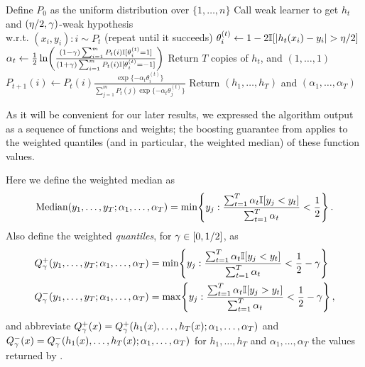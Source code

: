 \documentclass[12pt,a4paper,oneside,onecolumn]{book}
\def\hspace#1{}%
\begin{document}
\begin{algorithm}[ht]
\label{alg:medboost}
\caption{($\{(x_i,y_i)\}_{i\in[m]}$,$T$,$\adv$,$\dev$)}
\begin{algorithmic}[1]
\State Define $P_{0}$ as the uniform distribution over $\{1,\ldots,n\}$
    \State Call weak learner to get $h_{t}$ and $(\eta/2,\gamma)$-weak hypothesis \\ 
    \hspace{0.625cm} w.r.t. $(x_{i},y_{i})\! :\! i \!\sim\! P_{t}$ (repeat until it succeeds)
        \State $\theta_{i}^{(t)} \gets 1 - 2 \mathbb{I}[ |h_{t}(x_{i}) - y_{i}| > \eta/2 ]$
    \EndFor
    \State $\alpha_{t} \gets \frac{1}{2} \ln\!\left( \frac{ (1-\gamma) \sum_{i=1}^{m} P_{t}(i) \mathbb{I}[ \theta_{i}^{(t)} = 1 ] }{ (1+\gamma) \sum_{i=1}^{m} P_{t}(i) \mathbb{I}[ \theta_{i}^{(t)} = -1 ] } \right)$
        \State Return $T$ copies of $h_{t}$, and $(1,\ldots,1)$
    \EndIf
        \State $P_{t+1}(i) \gets P_{t}(i) \frac{\exp\{-\alpha_{t}\theta_{i}^{(t)}\}}{\sum_{j=1}^{m} P_{t}(j) \exp\{-\alpha_{t}\theta_{j}^{(t)}\}}$
    \EndFor
\EndFor
\State Return $(h_{1},\ldots,h_{T})$ and $(\alpha_{1},\ldots,\alpha_{T})$
\end{algorithmic}
\end{algorithm}

As it will be convenient for our later results, we expressed
the algorithm output as a sequence
of functions and weights; 
the boosting guarantee from \citet{kegl2003robust} applies to the weighted quantiles (and in particular, the weighted median) of these function values.

\begin{sloppypar}
Here we define the weighted median as 
\begin{equation*}
\text{Median}(y_{1},\ldots,y_{T};\alpha_{1},\ldots,\alpha_{T}) = \min\!\left\{ y_{j} : \frac{\sum_{t=1}^{T} \alpha_{t} \mathbb{I}[ y_{j} < y_{t} ] }{\sum_{t=1}^{T} \alpha_{t}} < \frac{1}{2} \right\}.
\end{equation*}
Also define the weighted \emph{quantiles}, for $\gamma \in [0,1/2]$, as 
\begin{align*}
Q_{\gamma}^{+}(y_{1},\ldots,y_{T};\alpha_{1},\ldots,\alpha_{T}) & = \min\!\left\{ y_{j} : \frac{\sum_{t=1}^{T} \alpha_{t} \mathbb{I}[ y_{j} < y_{t} ] }{\sum_{t=1}^{T} \alpha_{t}} < \frac{1}{2} - \gamma \right\}
\\ Q_{\gamma}^{-}(y_{1},\ldots,y_{T};\alpha_{1},\ldots,\alpha_{T}) & = \max\!\left\{ y_{j} : \frac{\sum_{t=1}^{T} \alpha_{t} \mathbb{I}[ y_{j} > y_{t} ] }{\sum_{t=1}^{T} \alpha_{t}} < \frac{1}{2} - \gamma \right\},
\end{align*}
and abbreviate $Q_{\gamma}^{+}(x) = Q_{\gamma}^{+}(h_{1}(x),\ldots,h_{T}(x);\alpha_{1},\ldots,\alpha_{T})$ and $Q_{\gamma}^{-}(x) = Q_{\gamma}^{-}(h_{1}(x),\ldots,h_{T}(x);\alpha_{1},\ldots,\alpha_{T})$ 
for $h_{1},\ldots,h_{T}$ and $\alpha_{1},\ldots,\alpha_{T}$ the values returned by .
\end{sloppypar}
\end{document}
